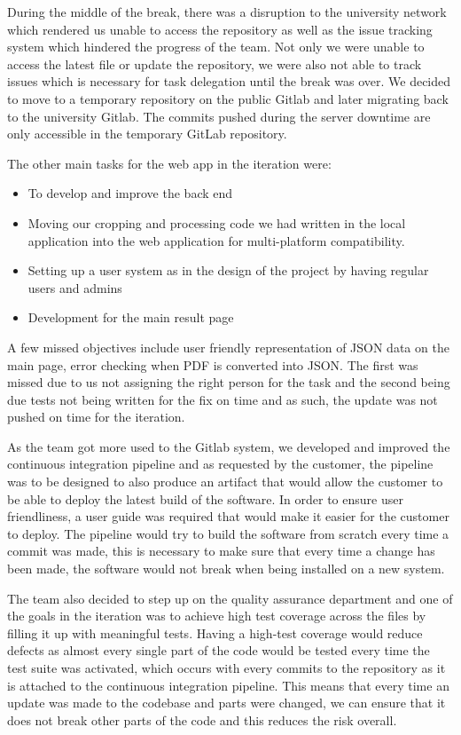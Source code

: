 \documentclass{l3proj}
\begin{document}
During the middle of the break, there was a disruption to the university network which rendered us unable to access the repository as well as the issue tracking system which hindered the progress of the team. Not only we were unable to access the latest file or update the repository, we were also not able to track issues which is necessary for task delegation until the break was over. We decided to move to a temporary repository on the public Gitlab and later migrating back to the university Gitlab. The commits pushed during the server downtime are only accessible in the temporary GitLab repository.

The other main tasks for the web app in the iteration were:
\begin{itemize}
\item To develop and improve the back end
\item Moving our cropping and processing code we had written in the local application into the web application for multi-platform compatibility.
\item Setting up a user system as in the design of the project by having regular users and admins
\item Development for the main result page
\end{itemize}

A few missed objectives include user friendly representation of JSON data on the main page, error checking when PDF is converted into JSON. The first was missed due to us not assigning the right person for the task and the second being due tests not being written for the fix on time and as such, the update was not pushed on time for the iteration.

As the team got more used to the Gitlab system, we developed and improved the continuous integration pipeline and as requested by the customer, the pipeline was to be designed to also produce an artifact that would allow the customer to be able to deploy the latest build of the software. In order to ensure user friendliness, a user guide was required that would make it easier for the customer to deploy. The pipeline would try to build the software from scratch every time a commit was made, this is necessary to make sure that every time a change has been made, the software would not break when being installed on a new system.

The team also decided to step up on the quality assurance department and one of the goals in the iteration was to achieve high test coverage across the files by filling it up with meaningful tests. Having a high-test coverage would reduce defects as almost every single part of the code would be tested every time the test suite was activated, which occurs with every commits to the repository as it is attached to the continuous integration pipeline. This means that every time an update was made to the codebase and parts were changed, we can ensure that it does not break other parts of the code and this reduces the risk overall.
\end{document}
